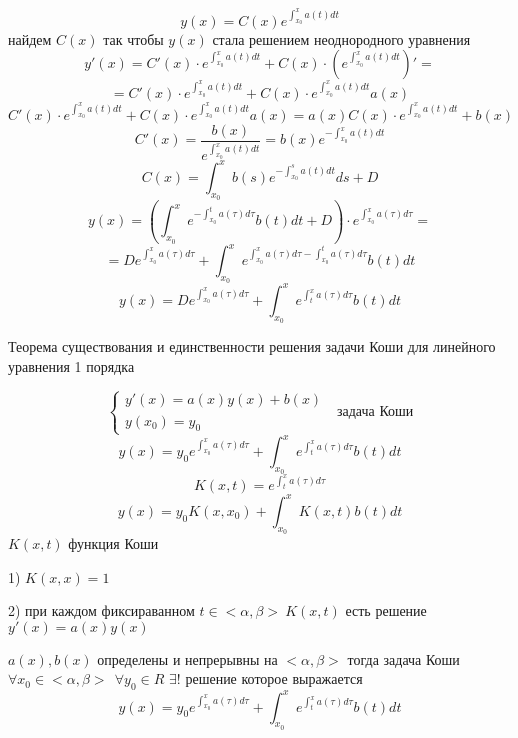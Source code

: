 \begin{block}
  $$
  y(x) = C(x) e^{\int_{x_0}^x a(t) dt}
  $$
  найдем $C(x)$ так чтобы $y(x)$ стала решением неоднородного уравнения
  $$
  y'(x) = C'(x) \cdot e^{\int_{x_0}^x a(t) dt} +
  C(x) \cdot \left( e^{\int_{x_0}^x a(t) dt} \right)' =
  $$
  $$
  = C'(x) \cdot e^{\int_{x_0}^x a(t) dt} +
  C(x) \cdot e^{\int_{x_0}^x a(t) dt} a(x)
  $$
  $$
  C'(x) \cdot e^{\int_{x_0}^x a(t) dt} +
  C(x) \cdot e^{\int_{x_0}^x a(t) dt} a(x) =
  a(x) C(x) \cdot e^{\int_{x_0}^x a(t) dt} + b(x)
  $$
  $$
  C'(x) = \frac{b(x)}{e^{\int_{x_0}^x a(t) dt}} =
  b(x) e^{-\int_{x_0}^x a(t) dt}
  $$
  $$
  C(x) = \int_{x_0}^x b(s) e^{-\int_{x_0}^s a(t) dt} ds + D
  $$
  $$
  y(x) = \left( \int_{x_0}^{x} e^{-\int_{x_0}^t a(\tau) d\tau}
  b(t)dt + D \right) \cdot e^{\int_{x_0}^x a(\tau) d\tau} =
  $$
  $$
  = D e^{\int_{x_0}^x a(\tau) d\tau} + \int_{x_0}^x
  e^{\int_{x_0}^x a(\tau) d\tau - \int_{x_0}^t a(\tau) d\tau} b(t)dt
  $$
  $$
  y(x) = D e^{\int_{x_0}^x a(\tau) d\tau} + \int_{x_0}^x
  e^{\int_{t}^x a(\tau) d\tau} b(t)dt
  $$
\end{block}

\begin{title}[\Large]
  Теорема существования и единственности решения задачи Коши для линейного
  уравнения 1 порядка
\end{title}

\begin{block}
  $$
  \left\{
  \begin{array}{l}
    y'(x) = a(x)y(x) + b(x) \\
    y(x_0) = y_0
  \end{array}
  \right. ~~~ \text{задача Коши}
  $$
  $$
  y(x) = y_0 e^{\int_{x_0}^x a(\tau) d\tau} + \int_{x_0}^x
  e^{\int_{t}^x a(\tau) d\tau} b(t)dt
  $$
  $$
  K(x, t) = e^{\int_t^x a(\tau) d\tau}
  $$
  $$
  y(x) = y_0 K(x, x_0) + \int_{x_0}^x K(x, t) b(t) dt
  $$
  $K(x, t)$ функция Коши
\end{block}

\begin{block}[Свойства]
  1) $K(x, x) = 1$

  2) при каждом фиксираванном $t \in <\alpha, \beta> ~ K(x, t)$ есть решение
  $y'(x) = a(x)y(x)$
\end{block}

\begin{theorem}
  $a(x), b(x)$ определены и непрерывны на $<\alpha, \beta>$
  тогда задача Коши $\forall x_0 \in <\alpha, \beta> ~~ \forall y_0 \in R$
  $\exists !$ решение которое выражается
  $$
  y(x) = y_0 e^{\int_{x_0}^x a(\tau) d\tau} + \int_{x_0}^x
  e^{\int_{t}^x a(\tau) d\tau} b(t)dt
  $$
\end{theorem}


